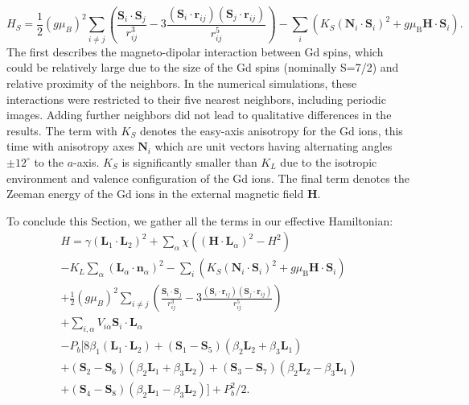 \begin{equation}
     H_S=\frac{1}{2}(g \mu_B)^2\sum_{i\neq j}\left(\frac{\bm{S}_i\cdot \bm{S}_j}{r_{ij}^3}-3\frac{(\bm{S}_i\cdot \bm{r}_{ij})(\bm{S}_j\cdot \bm{r}_{ij})}{r_{ij}^5}\right) - \sum_i\left( K_S(\bm{N}_i\cdot \bm{S}_i)^2 + g\mu_\mathrm{B} \bm{H} \cdot \bm{S}_i\right). 
\end{equation}
The first describes the magneto-dipolar interaction between Gd spins, which could be relatively large due to the size of the Gd spins (nominally S=7/2) and relative proximity of the neighbors.
In the numerical simulations, these interactions were restricted to their five nearest neighbors, including periodic images.
Adding further neighbors did not lead to qualitative differences in the results.
The term with $K_S$ denotes the easy-axis anisotropy for the Gd ions, this time with anisotropy axes $\bm{N}_i$ which are unit vectors having alternating angles $\pm 12^\circ$ to the $a$-axis.
$K_S$ is significantly smaller than $K_L$ due to the isotropic environment and valence configuration of the Gd ions.
The final term denotes the Zeeman energy of the Gd ions in the external magnetic field $\bm{H}$.

To conclude this Section, we gather all the terms in our effective Hamiltonian:
\begin{multline}
    \label{eq:GdMn2O5_model}
    H=\gamma(\bm{L}_1\cdot \bm{L}_2)^2 +\sum_{\alpha}\chi((\bm{H}\cdot \bm{L}_\alpha)^2-H^2)\\
    -K_L\sum_\alpha(\bm{L}_\alpha\cdot \bm{n}_\alpha)^2 -\sum_i\left( K_S(\bm{N}_i\cdot \bm S_i)^2+ g\mu_\mathrm{B} \bm{H} \cdot \bm{S}_i\right) \\
    + \frac{1}{2}(g \mu_B)^2\sum_{i\neq j}\left(\frac{\bm S_i\cdot \bm S_j}{r_{ij}^3}-3\frac{(\bm S_i\cdot \bm{r}_{ij})(\bm S_j\cdot \bm{r}_{ij})}{r_{ij}^5}\right)
     \\+ \sum_{i,\alpha}V_{i\alpha}\bm{S}_i\cdot \bm{L}_\alpha \\
    -P_b[8 \beta_1 (\bm{L}_1\cdot \bm{L}_2)+(\bm{S}_1-\bm{S}_5)(\beta_2 \bm{L}_2 + \beta_3 \bm{L}_1) \\+ (\bm{S}_2-\bm{S}_6)(\beta_2 \bm{L}_1 + \beta_3 \bm{L}_2)
    + (\bm{S}_3-\bm{S}_7)(\beta_2 \bm{L}_2 - \beta_3 \bm{L}_1) \\
    +(\bm{S}_4-\bm{S}_8)(\beta_2 \bm{L}_1 - \beta_3 \bm{L}_2)]
    + P_b^2/2.
\end{multline}

